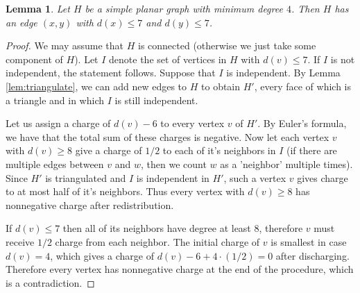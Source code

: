 \documentclass[10pt,a4paper]{amsart}
\newtheorem{lemma}{Lemma}
\begin{document}
\begin{lemma}\label{lem:discharge}
    Let $H$ be a simple planar graph with minimum degree $4$. Then $H$ has an edge $(x, y)$ with $d(x) \leq 7$ and $d(y) \leq 7$.
\end{lemma}

\begin{proof}
    We may assume that $H$ is connected (otherwise we just take some component of $H$).
    Let $I$ denote the set of vertices in $H$ with $d(v) \leq 7$. If $I$ is not independent, the statement follows. Suppose that $I$ is independent. By Lemma \ref{lem:triangulate}, we can add new edges to $H$ to obtain $H'$, every face of which is a triangle and in which $I$ is still independent.

    Let us assign a charge of $d(v) - 6$ to every vertex $v$ of $H'$. By Euler's formula, we have that the total sum of these charges is negative. 
    Now let each vertex $v$ with $d(v) \geq 8$ give a charge of $1/2$ to each of it's neighbors in $I$ (if there are multiple edges between $v$ and $w$, then we count $w$ as a 'neighbor' multiple times). Since $H'$ is triangulated and $I$ is independent in $H'$, such a vertex $v$ gives charge to at most half of it's neighbors. Thus every vertex with $d(v) \geq 8$ has nonnegative charge after redistribution.

    If $d(v) \leq 7$ then all of its neighbors have degree at least $8$, therefore $v$ must receive $1/2$ charge from each neighbor. The initial charge of $v$ is smallest in case $d(v) = 4$, which gives a charge of $d(v)-6 + 4\cdot(1/2) = 0$ after discharging. Therefore every vertex has nonnegative charge at the end of the procedure, which is a contradiction. 
\end{proof}
\end{document}
